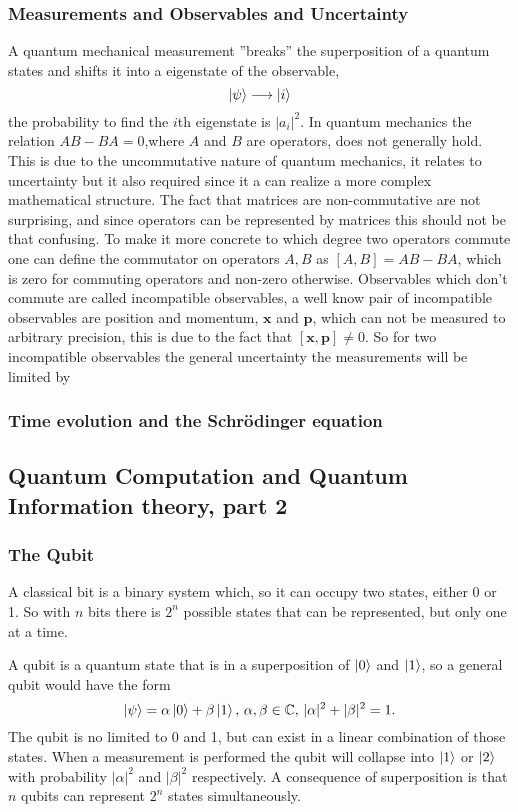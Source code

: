 \subsubsection{Measurements and Observables and Uncertainty}
A quantum mechanical measurement ''breaks'' the superposition of a quantum states and shifts it into a eigenstate of the observable,
\begin{equation}
\ket{\psi} \longrightarrow \ket{i}
\end{equation}
the probability to find the $i$th eigenstate is $|a_i|^2$. 
In quantum mechanics the relation $AB - BA = 0$,where $A$ and $B$ are operators, does not generally hold. This is due to the uncommutative nature of quantum mechanics, it relates to uncertainty but it also required since it a can realize a more complex mathematical structure. The fact that matrices are non-commutative are not surprising, and since operators can be represented by matrices this should not be that confusing. 
To make it more concrete to which degree two operators commute one can define  the commutator on operators $A,B$ as $[A,B] = AB - BA$, which is zero for commuting operators and non-zero otherwise. 
Observables which don't commute are called incompatible observables, a well know pair of incompatible observables are position and momentum, $\mathbf{x}$ and $\mathbf{p}$, which can not be measured to arbitrary precision, this is due to the fact that $[\mathbf{x},\mathbf{p}] \neq 0$. So for two incompatible observables the general uncertainty the measurements will be limited by  

\subsubsection{Time evolution and the Schrödinger equation}

\subsection{Quantum Computation and Quantum Information theory, part 2}

\subsubsection{The Qubit}
A classical bit is a binary system which, so it can occupy two states, either 0 or 1. So with $n$ bits there is $2^n$ possible states that can be represented, but only one at a time.

A qubit is a quantum state that is in a superposition of $\ket{0}$ and $\ket{1}$, so a general qubit would have the form
\begin{equation}
\label{eq:qubit}
\ket{\psi} = \alpha\ket{0} + \beta\ket{1},\,\alpha,\beta \in \mathbb{C},\, |\alpha|^2 + |\beta|^2 = 1.
\end{equation}
The qubit is no limited to 0 and 1, but can exist in a linear combination of those states. When a measurement is performed the qubit will collapse into $\ket{1}$ or $\ket{2}$ with probability $|\alpha|^2$ and $|\beta|^2$ respectively. A consequence of superposition is that $n$ qubits can represent $2^n$ states simultaneously.

